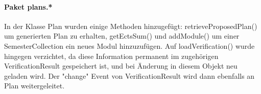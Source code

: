 \paragraph{Paket plans.*} In der Klasse Plan wurden einige Methoden hinzugefügt:  retrieveProposedPlan() um generierten Plan zu erhalten, getEctsSum() und  addModule() um einer SemesterCollection ein neues Modul hinzuzufügen. Auf loadVerification() wurde hingegen verzichtet, da diese Information permanent im zugehörigen VerificationResult gespeichert ist, und bei Änderung in diesem Objekt neu geladen wird. Der "change" Event von VerificationResult wird dann ebenfalls an Plan weitergeleitet.